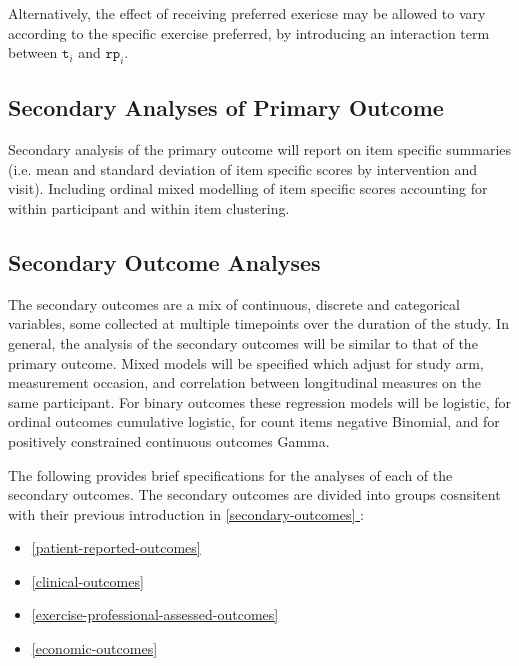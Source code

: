 \documentclass[
]{article}
\providecommand{\tightlist}{%
  \setlength{\itemsep}{0pt}\setlength{\parskip}{0pt}}
\newcommand*{\fullref}[1]{\hyperref[{#1}]{\autoref*{#1} \nameref*{#1}}} %
\begin{document}
Alternatively, the effect of receiving preferred exericse may be allowed to vary according to the specific exercise preferred, by introducing an interaction term between $\texttt{t}_i$ and $\texttt{rp}_i$.

\hypertarget{secondary-analyses-primary}{%
  \subsection{Secondary Analyses of Primary Outcome}\label{secondary-analyses-primary}}

Secondary analysis of the primary outcome will report on item specific summaries (i.e. mean and standard deviation of item specific scores by intervention and visit).
Including ordinal mixed modelling of item specific scores accounting for within participant and within item clustering.

\hypertarget{secondary-analyses}{%
  \subsection{Secondary Outcome Analyses}\label{secondary-outcome-analyses}}

The secondary outcomes are a mix of continuous, discrete and categorical variables, some collected at multiple timepoints over the duration of the study.
In general, the analysis of the secondary outcomes will be similar to that of the primary outcome.
Mixed models will be specified which adjust for study arm, measurement occasion, and correlation between longitudinal measures on the same participant.
For binary outcomes these regression models will be logistic, for ordinal outcomes cumulative logistic, for count items negative Binomial, and for positively constrained continuous outcomes Gamma.

The following provides brief specifications for the analyses of each of the secondary outcomes.
The secondary outcomes are divided into groups cosnsitent with their previous introduction in \fullref{secondary-outcomes}:

\begin{itemize}
  \tightlist
  \item \ref{patient-reported-outcomes} 
  \item \ref{clinical-outcomes} 
  \item \ref{exercise-professional-assessed-outcomes} 
  \item \ref{economic-outcomes} 
\end{itemize}
\end{document}
